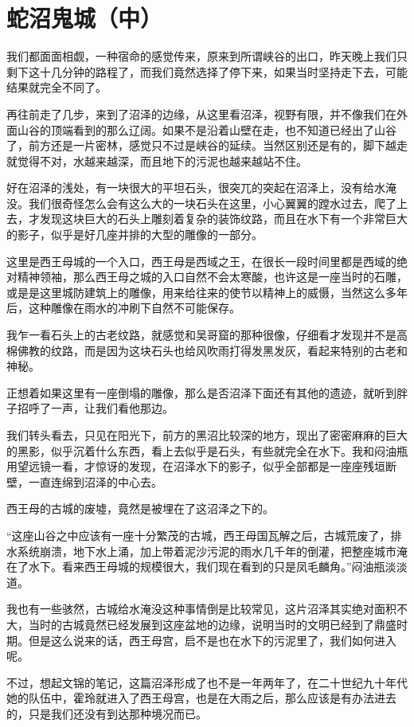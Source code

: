 \chapter{蛇沼鬼城（中）}

我们都面面相觑，一种宿命的感觉传来，原来到所谓峡谷的出口，昨天晚上我们只剩下这十几分钟的路程了，而我们竟然选择了停下来，如果当时坚持走下去，可能结果就完全不同了。

再往前走了几步，来到了沼泽的边缘，从这里看沼泽，视野有限，并不像我们在外面山谷的顶端看到的那么辽阔。如果不是沿着山壁在走，也不知道已经出了山谷了，前方还是一片密林，感觉只不过是峡谷的延续。当然区别还是有的，脚下越走就觉得不对，水越来越深，而且地下的污泥也越来越站不住。

好在沼泽的浅处，有一块很大的平坦石头，很突兀的突起在沼泽上，没有给水淹没。我们很奇怪怎么会有这么大的一块石头在这里，小心翼翼的蹚水过去，爬了上去，才发现这块巨大的石头上雕刻着复杂的装饰纹路，而且在水下有一个非常巨大的影子，似乎是好几座并排的大型的雕像的一部分。

这里是西王母城的一个入口，西王母是西域之王，在很长一段时间里都是西域的绝对精神领袖，那么西王母之城的入口自然不会太寒酸，也许这是一座当时的石雕，或是是这里城防建筑上的雕像，用来给往来的使节以精神上的威慑，当然这么多年后，这种雕像在雨水的冲刷下自然不可能保存。

我乍一看石头上的古老纹路，就感觉和吴哥窟的那种很像，仔细看才发现并不是高棉佛教的纹路，而是因为这块石头也给风吹雨打得发黑发灰，看起来特别的古老和神秘。

正想着如果这里有一座倒塌的雕像，那么是否沼泽下面还有其他的遗迹，就听到胖子招呼了一声，让我们看他那边。

我们转头看去，只见在阳光下，前方的黑沼比较深的地方，现出了密密麻麻的巨大的黑影，似乎沉着什么东西，看上去似乎是石头，有些就完全在水下。我和闷油瓶用望远镜一看，才惊讶的发现，在沼泽水下的影子，似乎全部都是一座座残垣断壁，一直连绵到沼泽的中心去。

西王母的古城的废墟，竟然是被埋在了这沼泽之下的。

“这座山谷之中应该有一座十分繁茂的古城，西王母国瓦解之后，古城荒废了，排水系统崩溃，地下水上涌，加上带着泥沙污泥的雨水几千年的倒灌，把整座城市淹在了水下。看来西王母城的规模很大，我们现在看到的只是凤毛麟角。”闷油瓶淡淡道。

我也有一些骇然，古城给水淹没这种事情倒是比较常见，这片沼泽其实绝对面积不大，当时的古城竟然已经发展到这座盆地的边缘，说明当时的文明已经到了鼎盛时期。但是这么说来的话，西王母宫，启不是也在水下的污泥里了，我们如何进入呢。

不过，想起文锦的笔记，这篇沼泽形成了也不是一年两年了，在二十世纪九十年代她的队伍中，霍玲就进入了西王母宫，也是在大雨之后，那么应该是有办法进去的，只是我们还没有到达那种境况而已。

